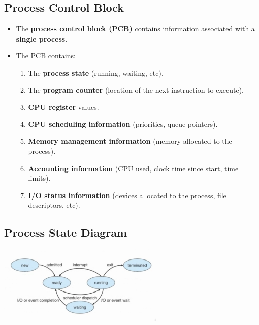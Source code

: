 \documentclass{article}
\begin{document}
    \subsection*{Process Control Block}
    \begin{itemize}
        \item The \textbf{process control block (PCB)} contains information associated with a \textbf{single process}.
        \item The PCB contains:
        \begin{enumerate}
            \item The \textbf{process state} (running, waiting, etc).
            \item The \textbf{program counter} (location of the next instruction to execute).
            \item \textbf{CPU register} values.
            \item \textbf{CPU scheduling information} (priorities, queue pointers).
            \item \textbf{Memory management information} (memory allocated to the process).
            \item \textbf{Accounting information} (CPU used, clock time since start, time limits).
            \item \textbf{I/O status information} (devices allocated to the process, file descriptors, etc). 
        \end{enumerate}
    \end{itemize}

    \subsection*{Process State Diagram}
    \begin{center}
        \includegraphics[width=300px]{images/Process-State-Diagram.png}
    \end{center}
\end{document}
